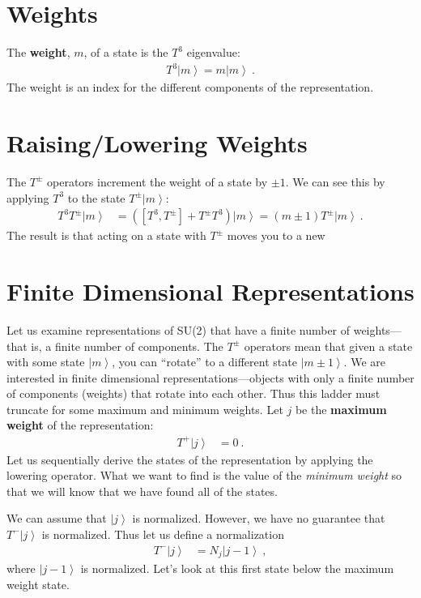 \documentclass[12pt]{article}
\numberwithin{equation}{section}
\newcommand{\ket}[1]{\left|#1\right\rangle}    %
\begin{document}
\section{Weights}

The \textbf{weight}, $m$, of a state is the $T^3$ eigenvalue:
\begin{align}
	T^3\ket{m} = m \ket{m} \ .
\end{align}
The weight is an index for the different components of the representation. 

\section{Raising/Lowering Weights}

The $T^\pm$ operators increment the weight of a state by $\pm 1$. We can see this by applying $T^3$ to the state $T^\pm\ket{m}$:
\begin{align}
	T^3 T^\pm \ket{m} &= \left([T^3, T^\pm] + T^\pm T^3 \right) \ket{m} 
	= \left( m \pm 1 \right) T^\pm \ket{m} \ .
\end{align}
The result is that acting on a state with $T^\pm$ moves you to a new 

\section{Finite Dimensional Representations}

Let us examine representations of SU(2) that have a finite number of weights---that is, a finite number of components. The $T^\pm$ operators mean that given a state with some state $\ket{m}$, you can ``rotate'' to a different state $\ket{m\pm 1}$. We are interested in finite dimensional representations---objects with only a finite number of components (weights) that rotate into each other. Thus this ladder must truncate for some maximum and minimum weights. 
%
Let $j$ be the \textbf{maximum weight} of the representation:
\begin{align}
	T^+\ket{j} &= 0 \ .
\end{align}
Let us sequentially derive the states of the representation by applying the lowering operator. What we want to find is the value of the \emph{minimum weight} so that we will know that we have found all of the states.

We can assume that $\ket{j}$ is normalized. However, we have no guarantee that $T^-\ket{j}$ is normalized. Thus let us define a normalization
\begin{align}
	T^- \ket{j} &= N_j \ket{j-1} \ ,
\end{align}
where $\ket{j-1}$ is normalized. Let's look at this first state below the maximum weight state.
\end{document}

